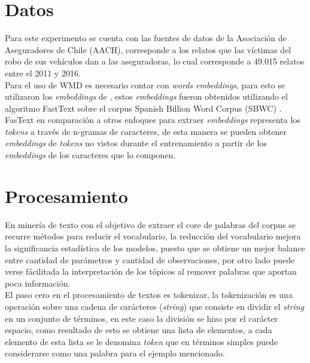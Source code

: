 \documentclass[letterpaper,12pt,oneside]{book} %
\begin{document}

\section{Datos}

Para este experimento se cuenta con las fuentes de datos de la Asociación de Aseguradores de Chile (AACH), corresponde a los relatos que las víctimas del robo de sus vehículos dan a las aseguradoras, lo cual corresponde a 49.015 relatos entre el 2011 y 2016.\\


Para el uso de WMD es necesario contar con \textit{words embeddings}, para esto se utilizaron los \textit{embeddings} de \citep{fastextSBWC}, estos \textit{embeddings} fueron obtenidos utilizando el algoritmo FastText \citep{bojanowski2017enriching} sobre el corpus Spanish Billion Word Corpus (SBWC) \citep{cardellinoSBWCE}. FasText en comparación a otros enfoques para extraer \textit{embeddings} representa los \textit{tokens} a través de n-gramas de caracteres, de esta manera se pueden obtener \textit{embeddings} de \textit{tokens} no vistos durante el entrenamiento a partir de los \textit{embeddings} de los caracteres que lo componen.

\section{Procesamiento}

En minería de texto con el objetivo de extraer el core de palabras del corpus se recurre métodos para reducir el vocabulario, la reducción del vocabulario mejora la significancia estadística de los modelos, puesto que se obtiene un mejor balance entre cantidad de parámetros y cantidad de observaciones, por otro lado puede verse fácilitada la interpretación de los tópicos al remover palabras que aportan poca información. \\

El paso cero en el procesamiento de textos es tokenizar, la tokenización es una operación sobre una cadena de carácteres (\textit{string}) que consiste en dividir el \textit{string} en un conjunto de términos, en este caso la división se hizo por el carácter espacio, como resultado de esto se obtiene una lista de elementos, a cada elemento de esta lista se le denomina \textit{token} que en términos simples puede considerarse como una palabra para el ejemplo mencionado. \\
\end{document}
